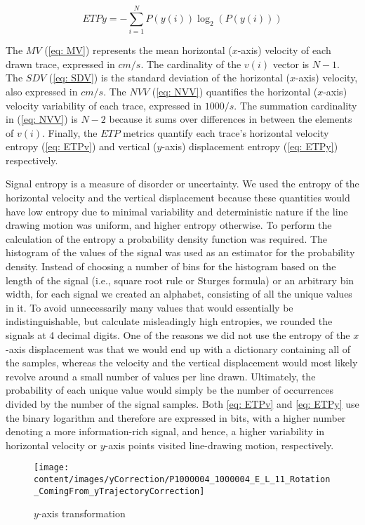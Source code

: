 \begin{equation} \label{eq: ETPy}
ETPy = -\sum_{i=1}^{N}P(y(i))\log_{2}(P(y(i)))
\end{equation}

\noindent
The $MV$ (\ref{eq: MV}) represents the mean horizontal ($x$-axis) velocity of each drawn trace, expressed in $cm/s$. The cardinality of the $v(i)$ vector is $N-1$. The $SDV$ (\ref{eq: SDV}) is the standard deviation of the horizontal ($x$-axis) velocity, also expressed in $cm/s$. The $NVV$ (\ref{eq: NVV}) quantifies the horizontal ($x$-axis) velocity variability of each trace, expressed in $1000/s$. The summation cardinality in (\ref{eq: NVV}) is $N-2$ because it sums over differences in between the elements of $v(i)$. Finally, the $ETP$ metrics quantify each trace's horizontal velocity entropy (\ref{eq: ETPv}) and vertical ($y$-axis) displacement entropy (\ref{eq: ETPy}) respectively. 

Signal entropy is a measure of disorder or uncertainty. We used the entropy of the horizontal velocity and the vertical displacement because these quantities would have low entropy due to minimal variability and deterministic nature if the line drawing motion was uniform, and higher entropy otherwise. To perform the calculation of the entropy a probability density function was required. The histogram of the values of the signal was used as an estimator for the probability density. Instead of choosing a number of bins for the histogram based on the length of the signal (i.e., square root rule or Sturges formula) or an arbitrary bin width, for each signal we created an alphabet, consisting of all the unique values in it. To avoid unnecessarily many values that would essentially be indistinguishable, but calculate misleadingly high entropies, we rounded the signals at 4 decimal digits. One of the reasons we did not use the entropy of the $x$-axis displacement was that we would end up with a dictionary containing all of the samples, whereas the velocity and the vertical displacement would most likely revolve around a small number of values per line drawn. Ultimately, the probability of each unique value would simply be the number of occurrences divided by the number of the signal samples. Both \ref{eq: ETPv} and \ref{eq: ETPy} use the binary logarithm and therefore are expressed in bits, with a higher number denoting a more information-rich signal, and hence, a higher variability in horizontal velocity or $y$-axis points visited line-drawing motion, respectively. 

\begin{figure}[h]
\centering
  \texttt{[image: content/images/yCorrection/P1000004\_1000004\_E\_L\_11\_Rotation\_ComingFrom\_yTrajectoryCorrection]}
\caption{$y$-axis transformation}
\label{fig:yCorrection}
\end{figure}

